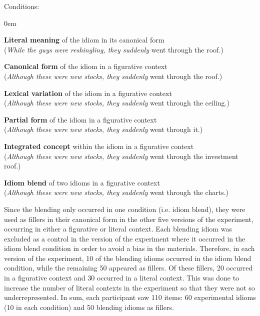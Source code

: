 \documentclass[output=paper
,modfonts
,nonflat]{langsci/langscibook}
\begin{document}
{\sc Conditions:}
\begin{enumerate}
\small{
\itemsep0em
\item 	{\bf Literal meaning}  of the idiom in its canonical form\\
	(\textit{While the guys were reshingling, they suddenly} went through the roof.)
\item 	{\bf Canonical form} of the idiom in a figurative context\\
	(\textit{Although these were new stocks, they suddenly} went through the roof.)
\item	{\bf Lexical variation}  of the idiom in a figurative context\\
	(\textit{Although these were new stocks, they suddenly} went through the ceiling.)
\item	{\bf Partial form}  of the idiom in a figurative context\\
	(\textit{Although these were new stocks, they suddenly} went through it.)
\item	{\bf Integrated concept}  within the idiom in a figurative context\\
	(\textit{Although these were new stocks, they suddenly} went through the investment roof.)
\item	{\bf Idiom blend}  of two idioms in a figurative context\\
	(\textit{Although these were new stocks, they suddenly} went through the charts.)
	}
\end{enumerate}


Since the blending  only occurred in one condition (i.e. idiom blend), they were used as fillers in their canonical form in the other five versions of the experiment, occurring in either a figurative or literal context. Each blending idiom  was excluded as a control in the version of the experiment where it occurred in the idiom blend condition in order to avoid a bias in the materials. Therefore, in each version of the experiment, 10 of the blending idioms occurred in the idiom blend condition, while the remaining 50 appeared as fillers. Of these fillers, 20 occurred in a figurative context and 30 occurred in a literal context. This was done to increase the number of literal contexts in the experiment so that they were not so underrepresented. In sum, each participant saw 110 items: 60 experimental idioms (10 in each condition) and 50 blending idioms as fillers.
\end{document}
